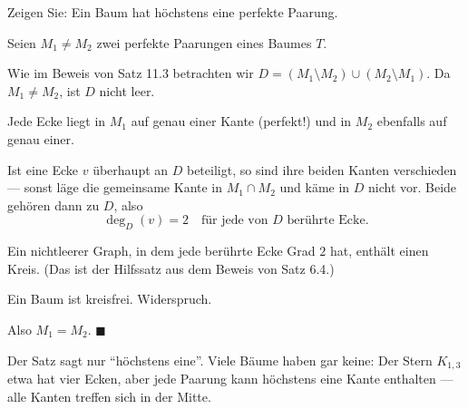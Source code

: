 \begin{aufgabe}
Zeigen Sie: Ein Baum hat höchstens eine perfekte Paarung.

\loesung
{}
Seien $M_1 \neq M_2$ zwei perfekte Paarungen eines Baumes $T$.

Wie im Beweis von Satz 11.3 betrachten wir $D = (M_1 \setminus M_2) \cup (M_2 \setminus M_1)$. Da $M_1 \neq M_2$, ist $D$ nicht leer.

Jede Ecke liegt in $M_1$ auf genau einer Kante (perfekt!) und in $M_2$ ebenfalls auf genau einer.

Ist eine Ecke $v$ überhaupt an $D$ beteiligt, so sind ihre beiden Kanten verschieden --- sonst läge die gemeinsame Kante in $M_1 \cap M_2$ und käme in $D$ nicht vor. Beide gehören dann zu $D$, also
\[ \deg_D(v) = 2 \quad \text{für jede von } D \text{ berührte Ecke.} \]

Ein nichtleerer Graph, in dem jede berührte Ecke Grad $2$ hat, enthält einen Kreis. (Das ist der Hilfssatz aus dem Beweis von Satz 6.4.)

Ein Baum ist kreisfrei. Widerspruch.

Also $M_1 = M_2$. $\blacksquare$

Der Satz sagt nur \enquote{höchstens eine}. Viele Bäume haben gar keine: Der Stern $K_{1,3}$ etwa hat vier Ecken, aber jede Paarung kann höchstens eine Kante enthalten --- alle Kanten treffen sich in der Mitte.
\end{aufgabe}

